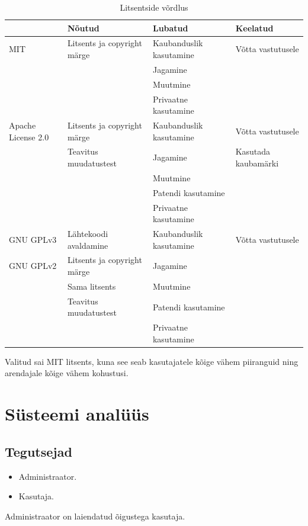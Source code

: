 \documentclass[a4paper,12pt]{article} %
\begin{document}
\begin{table}[H]%
\begin{center}
\begin{tabular}{|p{3cm}|p{4cm}|p{4cm}|p{4cm}|}
\hline
\rowcolor{rowgray}
 & Nõutud & Lubatud & Keelatud \\ \hline
MIT & Litsents ja copyright märge & Kaubanduslik kasutamine & Võtta vastutusele \\
 &  & Jagamine &  \\
 &  & Muutmine &  \\
 &  & Privaatne kasutamine &  \\ \hline
Apache \newline License 2.0 & Litsents ja copyright märge & Kaubanduslik kasutamine & Võtta vastutusele \\
 & Teavitus muudatustest & Jagamine & Kasutada kaubamärki \\
 &  & Muutmine &  \\
 &  & Patendi kasutamine &  \\
 &  & Privaatne kasutamine &  \\ \hline
GNU GPLv3 & Lähtekoodi avaldamine & Kaubanduslik kasutamine & Võtta vastutusele \\
GNU GPLv2 & Litsents ja copyright märge & Jagamine &  \\
 & Sama litsents & Muutmine &  \\
 & Teavitus muudatustest & Patendi kasutamine &  \\
 &  & Privaatne kasutamine & \\ \hline
\end{tabular}
\caption{Litsentside võrdlus}
\label{table_litsentside_vordlus}
\cite{Licences}
\end{center}
\end{table}
Valitud sai MIT litsents, kuna see seab kasutajatele kõige vähem piiranguid ning arendajale kõige vähem kohustusi.
\section{Süsteemi analüüs}
\subsection{Tegutsejad}
\begin{itemize}
\item Administraator.
\item Kasutaja.
\end{itemize}
Administraator on laiendatud õigustega kasutaja.
\end{document}
